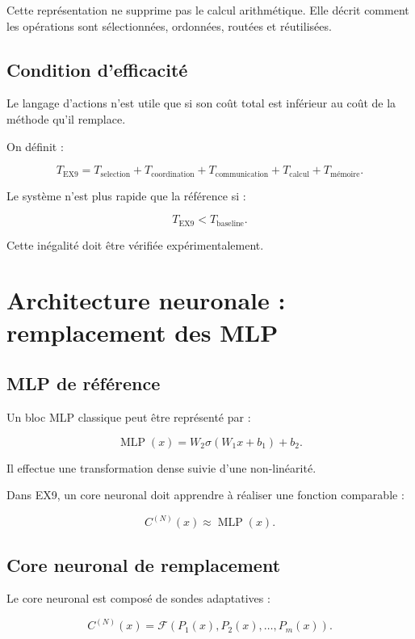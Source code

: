 \documentclass[11pt,a4paper]{article}
\begin{document}
Cette représentation ne supprime pas le calcul arithmétique.
Elle décrit comment les opérations sont sélectionnées, ordonnées,
routées et réutilisées.

\subsection{Condition d'efficacité}

Le langage d'actions n'est utile que si son coût total est inférieur
au coût de la méthode qu'il remplace.

On définit :

\[
T_{\mathrm{EX9}}
=
T_{\mathrm{selection}}
+
T_{\mathrm{coordination}}
+
T_{\mathrm{communication}}
+
T_{\mathrm{calcul}}
+
T_{\mathrm{mémoire}}.
\]

Le système n'est plus rapide que la référence si :

\[
T_{\mathrm{EX9}} < T_{\mathrm{baseline}}.
\]

Cette inégalité doit être vérifiée expérimentalement.

\section{Architecture neuronale : remplacement des MLP}

\subsection{MLP de référence}

Un bloc MLP classique peut être représenté par :

\[
\operatorname{MLP}(x)
=
W_2\sigma(W_1x+b_1)+b_2.
\]

Il effectue une transformation dense suivie d'une non-linéarité.

Dans EX9, un core neuronal doit apprendre à réaliser une fonction
comparable :

\[
C^{(N)}(x)
\approx
\operatorname{MLP}(x).
\]

\subsection{Core neuronal de remplacement}

Le core neuronal est composé de sondes adaptatives :

\[
C^{(N)}(x)
=
\mathcal{F}
\left(
P_1(x),P_2(x),\ldots,P_m(x)
\right).
\]
\end{document}
